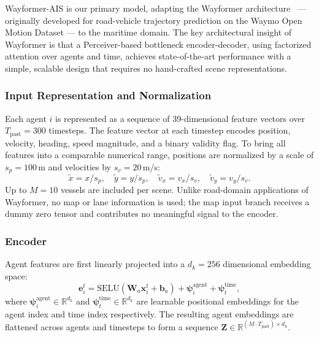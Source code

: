 \documentclass[12pt, a4paper]{article}
\begin{document}
Wayformer-AIS is our primary model, adapting the Wayformer
architecture~\citep{nayakanti2022wayformer} --- originally developed for
road-vehicle trajectory prediction on the Waymo Open Motion Dataset ---
to the maritime domain. The key architectural insight of Wayformer is
that a Perceiver-based bottleneck encoder-decoder, using factorized
attention over agents and time, achieves state-of-the-art performance
with a simple, scalable design that requires no hand-crafted
scene representations.

\subsubsection{Input Representation and Normalization}
\label{sec:normalization}

Each agent $i$ is represented as a sequence of 39-dimensional feature
vectors over $T_{\text{past}} = 300$ timesteps. The feature vector at
each timestep encodes position, velocity, heading, speed magnitude,
and a binary validity flag. To bring all features into a comparable
numerical range, positions are normalized by a scale of
$s_p = 100$\,m and velocities by $s_v = 20$\,m/s:
\begin{equation}
    \tilde{x} = x / s_p, \quad
    \tilde{y} = y / s_p, \quad
    \tilde{v}_x = v_x / s_v, \quad
    \tilde{v}_y = v_y / s_v.
    \label{eq:normalization}
\end{equation}
Up to $M = 10$ vessels are included per scene. Unlike road-domain
applications of Wayformer, no map or lane information is used; the
map input branch receives a dummy zero tensor and contributes no
meaningful signal to the encoder.

\subsubsection{Encoder}
\label{sec:encoder}

Agent features are first linearly projected into a $d_k = 256$
dimensional embedding space:
\begin{equation}
    \mathbf{e}_i^t = \text{SELU}\!\left(\mathbf{W}_a \mathbf{x}_i^t + \mathbf{b}_a\right)
    + \boldsymbol{\psi}_i^{\text{agent}}
    + \boldsymbol{\psi}_t^{\text{time}},
    \label{eq:agent_emb}
\end{equation}
where $\boldsymbol{\psi}_i^{\text{agent}} \in \mathbb{R}^{d_k}$ and
$\boldsymbol{\psi}_t^{\text{time}} \in \mathbb{R}^{d_k}$ are learnable
positional embeddings for the agent index and time index respectively.
The resulting agent embeddings are flattened across agents and timesteps
to form a sequence $\mathbf{Z} \in \mathbb{R}^{(M \cdot T_{\text{past}}) \times d_k}$.
\end{document}
